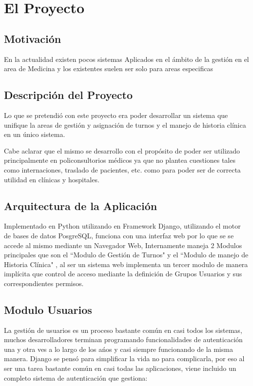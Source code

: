 \chapter{El Proyecto}


\section{Motivación}

En la actualidad existen pocos sistemas Aplicados en el ámbito de la gestión en
el area de Medicina y los existentes suelen ser solo para areas especificas


\section{Descripci\'on del Proyecto}

Lo que se pretendió con este proyecto era poder desarrollar un sistema que unifique
la areas de gestión y asignación de turnos y el manejo de historia clínica en 
un único sistema.

Cabe aclarar que el mismo se desarrollo con el propósito de poder ser utilizado 
principalmente en policonsultorios médicos ya que no plantea cuestiones tales como
internaciones, traslado de pacientes, etc. como para poder ser de correcta utilidad
en clínicas y hospitales. 


\section{Arquitectura de la Aplicación}

Implementado en Python utilizando en Framework Django, utilizando el motor de bases
de datos PosgreSQL, funciona con una interfaz web por lo que se se accede al
mismo mediante un Navegador Web, Internamente maneja 2 Modulos principales
que son el  ``Modulo de Gestión de Turnos" y el ``Modulo de manejo de
Historia Clínica" , al ser un sistema web implementa un tercer modulo de manera
implícita que control de acceso mediante la definición de Grupos Usuarios y
sus correspondientes permisos.


\section{Modulo Usuarios}

La gestión de usuarios es un proceso bastante común en casi todos los sistemas,
muchos desarrolladores terminan programando funcionalidades de autenticación 
una y otra ves a lo largo de los a\'nos y casi siempre funcionando de la misma 
manera. Django se pensó para simplificar la vida no para complicarla, por eso
al ser una tarea bastante común en casi todas las aplicaciones, viene incluido
un completo sistema de autenticación que gestiona:


